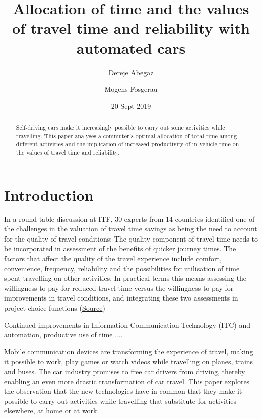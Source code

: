 \documentclass[12pt,a4paper,british]{article}
\begin{document}
\title{Allocation of time and the values of travel time and reliability with automated cars}

\author{Dereje Abegaz \and Mogens Fosgerau}

\date{20 Sept 2019}

\maketitle

\begin{abstract}
Self-driving cars make it increasingly possible to carry out some activities while travelling. This paper analyses a commuter's optimal allocation of total time among different activities and the implication of increased productivity of in-vehicle time on the values of travel time and reliability.
\end{abstract}

\section{Introduction}
\label{sec:introduction}


In a round-table discussion at ITF, 30 experts from 14 countries identified one of the challenges in the valuation of travel time savings as being the need to account for the quality of travel conditions: The quality component of travel time needs to be incorporated in assessment of the benefits of quicker journey times. The factors that affect the quality of the travel experience include comfort, convenience, frequency, reliability and the possibilities for utilisation of time spent travelling on other activities. In practical terms this means assessing the willingness-to-pay for reduced travel time versus the willingness-to-pay for improvements in travel conditions, and integrating these two assessments in project choice functions (\href{https://www.itf-oecd.org/sites/default/files/docs/value-saving-travel-time.pdf}{Source})

Continued improvements in Information Communication Technology (ITC) and automation, productive use of time .... 

Mobile communication devices are transforming the experience of travel, making it possible to work, play games or watch videos while travelling on planes, trains and buses. The car industry promises to free car drivers from driving, thereby enabling an even more drastic transformation of car travel. This paper explores the observation that the new technologies have in common that they make it possible to carry out activities while travelling that substitute for activities elsewhere, at home or at work.
\end{document}
